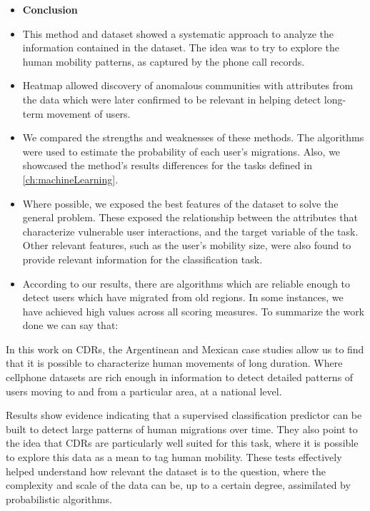 \begin{itemize}

    \item \textbf{Conclusion}

    \item This method and dataset showed a systematic approach to analyze the information contained in the dataset.
    The idea was to try to explore the human mobility patterns, as captured by the phone call records.

    \item Heatmap allowed discovery of anomalous communities with attributes from the data which were later confirmed to be relevant in helping detect long-term movement of users.

    \item We compared the strengths and weaknesses of these methods.
    The algorithms  were used to estimate the probability of each user's migrations.
    Also, we showcased the method's results differences for the tasks defined in \cref{ch:machineLearning}.

    \item Where possible, we exposed the best features of the dataset to solve the general problem.
    These exposed the relationship between the attributes that characterize vulnerable user interactions, and the target variable of the task.
    Other relevant features, such as the user's mobility size, were also found to provide relevant information for the classification task.

    \item According to our results, there are algorithms which are reliable enough to detect users which have migrated from old regions. In some instances, we have achieved high values across all scoring measures. To summarize the work done we can say that:

\end{itemize}



In this work on CDRs, the Argentinean and Mexican case studies allow us to find that it is possible to characterize human movements of long duration.
Where cellphone datasets are rich enough in information to detect detailed patterns of users moving to and from a particular area, at a national level.


Results show evidence indicating that a supervised classification predictor can be built to detect large patterns of human migrations over time.
They also point to the idea that CDRs are particularly well suited for this task, where it is possible to explore this data as a mean to tag human mobility.
These tests effectively helped understand how relevant the dataset is to the question, where the complexity and scale of the data can be, up to a certain degree, assimilated by probabilistic algorithms.

